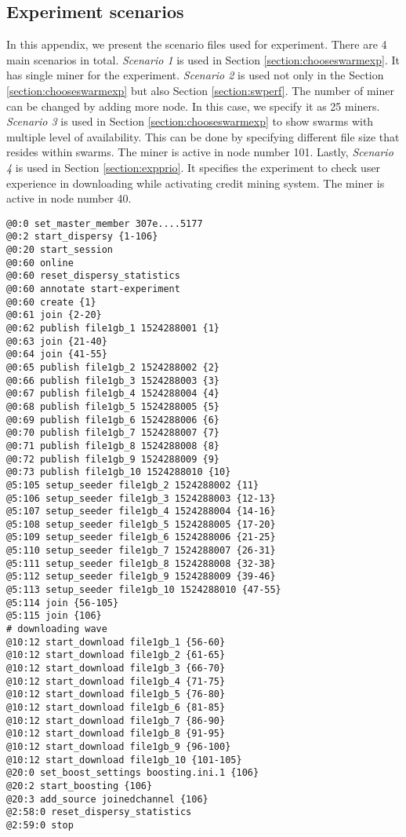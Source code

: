 \begin{appendices}
\chapter{Experiment scenarios}
\label{app:expscenario}

In this appendix, we present the scenario files used for experiment. There are 4 main scenarios in total. \textit{Scenario 1} is used in Section \ref{section:chooseswarmexp}. It has single miner for the experiment. \textit{Scenario 2} is used not only in the Section \ref{section:chooseswarmexp} but also Section \ref{section:swperf}. The number of miner can be changed by adding more node. In this case, we specify it as 25 miners. \textit{Scenario 3} is used in Section \ref{section:chooseswarmexp} to show swarms with multiple level of availability. This can be done by specifying different file size that resides within swarms. The miner is active in node number 101.  Lastly, \textit{Scenario 4} is used in Section \ref{section:expprio}. It specifies the experiment to check user experience in downloading while activating credit mining system. The miner is active in node number 40. 

\begin{lstlisting}[caption={Scenario 1.}]
@0:0 set_master_member 307e....5177
@0:2 start_dispersy {1-106}
@0:20 start_session
@0:60 online
@0:60 reset_dispersy_statistics
@0:60 annotate start-experiment
@0:60 create {1}
@0:61 join {2-20}
@0:62 publish file1gb_1 1524288001 {1}
@0:63 join {21-40}
@0:64 join {41-55}
@0:65 publish file1gb_2 1524288002 {2}
@0:66 publish file1gb_3 1524288003 {3}
@0:67 publish file1gb_4 1524288004 {4}
@0:68 publish file1gb_5 1524288005 {5}
@0:69 publish file1gb_6 1524288006 {6}
@0:70 publish file1gb_7 1524288007 {7}
@0:71 publish file1gb_8 1524288008 {8}
@0:72 publish file1gb_9 1524288009 {9}
@0:73 publish file1gb_10 1524288010 {10}
@5:105 setup_seeder file1gb_2 1524288002 {11}
@5:106 setup_seeder file1gb_3 1524288003 {12-13}
@5:107 setup_seeder file1gb_4 1524288004 {14-16}
@5:108 setup_seeder file1gb_5 1524288005 {17-20}
@5:109 setup_seeder file1gb_6 1524288006 {21-25}
@5:110 setup_seeder file1gb_7 1524288007 {26-31}
@5:111 setup_seeder file1gb_8 1524288008 {32-38}
@5:112 setup_seeder file1gb_9 1524288009 {39-46}
@5:113 setup_seeder file1gb_10 1524288010 {47-55}
@5:114 join {56-105}
@5:115 join {106}
# downloading wave
@10:12 start_download file1gb_1 {56-60}
@10:12 start_download file1gb_2 {61-65}
@10:12 start_download file1gb_3 {66-70}
@10:12 start_download file1gb_4 {71-75}
@10:12 start_download file1gb_5 {76-80}
@10:12 start_download file1gb_6 {81-85}
@10:12 start_download file1gb_7 {86-90}
@10:12 start_download file1gb_8 {91-95}
@10:12 start_download file1gb_9 {96-100}
@10:12 start_download file1gb_10 {101-105}
@20:0 set_boost_settings boosting.ini.1 {106}
@20:2 start_boosting {106}
@20:3 add_source joinedchannel {106}
@2:58:0 reset_dispersy_statistics
@2:59:0 stop
\end{lstlisting}


\end{appendices}
